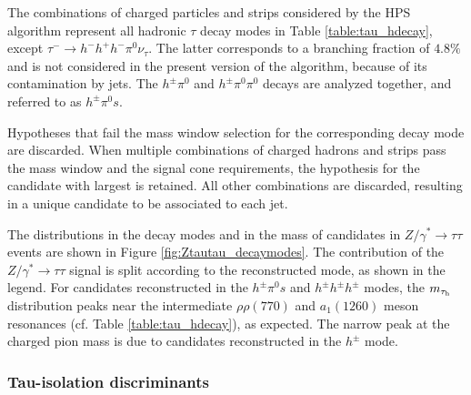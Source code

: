 The combinations of charged particles and strips considered by the HPS algorithm represent all hadronic \ensuremath{\tau} decay modes in Table \ref{table:tau_hdecay}, except \ensuremath{τ^{-} \longrightarrow h^{-}h^{+}h^{-}\pi^{0}\nu_{\tau}}. The latter corresponds to a branching fraction of \ensuremath{4.8\%} and is not considered in the present version of the algorithm, because of its contamination by jets. The \ensuremath{h^{\pm}\pi^{0}} and \ensuremath{h^{\pm}\pi^{0}\pi^{0}} decays are analyzed together, and referred to as \ensuremath{h^{\pm}\pi^{0}s}.

Hypotheses that fail the mass window selection for the corresponding decay mode are discarded. When multiple combinations of charged hadrons and strips pass the mass window and the signal cone requirements, the hypothesis for the candidate with largest \pt is retained. All other combinations are discarded, resulting in a unique \hadtau candidate to be associated to each jet.



The distributions in the decay modes and in the mass of \hadtau candidates in \ensuremath{Z/\gamma^{*} \longrightarrow \tau\tau} events are shown in Figure \ref{fig:Ztautau_decaymodes}. The contribution of the \ensuremath{Z/\gamma^{*} \longrightarrow \tau\tau} signal is split according to the reconstructed \hadtau mode, as shown in the legend. For \hadtau candidates reconstructed in the \ensuremath{h^{\pm}\pi^{0}s} and \ensuremath{h^{\pm}h^{\pm}h^{\pm}} modes, the \ensuremath{m_{\hadtau}} distribution peaks near the intermediate \ensuremath{ρ\rho(770)} and \ensuremath{a_{1}(1260)} meson resonances (cf. Table \ref{table:tau_hdecay}), as expected. The narrow peak at the charged pion mass is due to \hadtau candidates reconstructed in the \ensuremath{h^{\pm}} mode.

\subsubsection{Tau-isolation discriminants}



